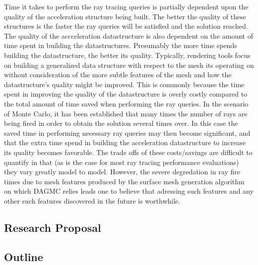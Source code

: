 \documentclass[10pt, a4paper]{article}
\begin{document}
Time it takes to perform the ray tracing queries is partially dependent upon the quality of the acceleration structure being built. The better the quality of these structures is the faster the ray queries will be satisfied and the solution reached. The quality of the accceleration datastructure is also dependent on the amount of time spent in building the datastructures. Presumably the more time spends building the datastructure, the better its quality. Typically, rendering tools focus on building a generalized data structure with respect to the mesh its operating on without consideration of the more subtle features of the mesh and how the datastructure's quality might be improved. This is commonly because the time spent in improving the quality of the datastructure is overly costly compared to the total amount of time saved when performing the ray queries. In the scenario of Monte Carlo, it has been established that many times the number of rays are being fired in order to obtain the solution several times over. In this case the saved time in performing necessary ray queries may then become significant, and that the extra time spend in building the acceleration datastructure to increase its quality becomes favorable. The trade offs of these costs/savings are difficult to quantify in that (as is the case for most ray tracing performance evaluations) they vary greatly model to model. However, the severe degredation in ray fire times due to mesh features produced by the surface mesh generation algorithm on which DAGMC relies leads one to believe that adressing such features and any other such features discovered in the future is worthwhile.

\subsection{Research Proposal}%

\subsection{Outline}
\end{document}
